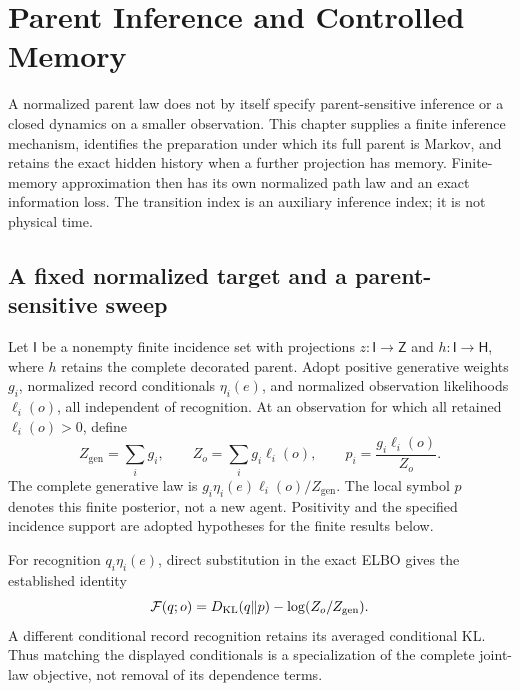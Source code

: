 \chapter{Parent Inference and Controlled Memory}
\label{ch:inference-memory}

A normalized parent law does not by itself specify parent-sensitive inference
or a closed dynamics on a smaller observation. This chapter supplies a finite
inference mechanism, identifies the preparation under which its full parent
is Markov, and retains the exact hidden history when a further projection
has memory. Finite-memory approximation then has its own normalized path
law and an exact information loss. The transition index is an auxiliary
inference index; it is not physical time. 

\section{A fixed normalized target and a parent-sensitive sweep}
\label{sec:rg-memory-parent-mechanism}

Let \(\mathsf I\) be a nonempty finite incidence set with projections
\(z:\mathsf I\to\mathsf Z\) and \(h:\mathsf I\to\mathsf H\), where
\(h\) retains the complete decorated parent. Adopt positive generative
weights \(g_i\), normalized record conditionals \(\eta_i(e)\), and
normalized observation likelihoods \(\ell_i(o)\), all independent of
recognition. At an observation for which all retained \(\ell_i(o)>0\),
define
\begin{equation}
 Z_{\mathrm{gen}}=\sum_i g_i,\qquad Z_o=\sum_i g_i\ell_i(o),
 \qquad p_i=\frac{g_i\ell_i(o)}{Z_o}.
\label{eq:rg-memory-target}
\end{equation}
The complete generative law is
\(g_i\eta_i(e)\ell_i(o)/Z_{\mathrm{gen}}\). The local symbol \(p\)
denotes this finite posterior, not a new agent. Positivity and the specified
incidence support are adopted hypotheses for the finite results below.

For recognition \(q_i\eta_i(e)\), direct substitution in the exact ELBO
gives the established identity
\begin{equation}
 \mathcal F(q;o)=D_{\mathrm{KL}}(q\Vert p)-\log(Z_o/Z_{\mathrm{gen}}).
\label{eq:rg-memory-fixed-vfe}
\end{equation}
A different conditional record recognition retains its averaged conditional
KL. Thus matching the displayed conditionals is a specialization of the
complete joint-law objective, not removal of its dependence terms.

